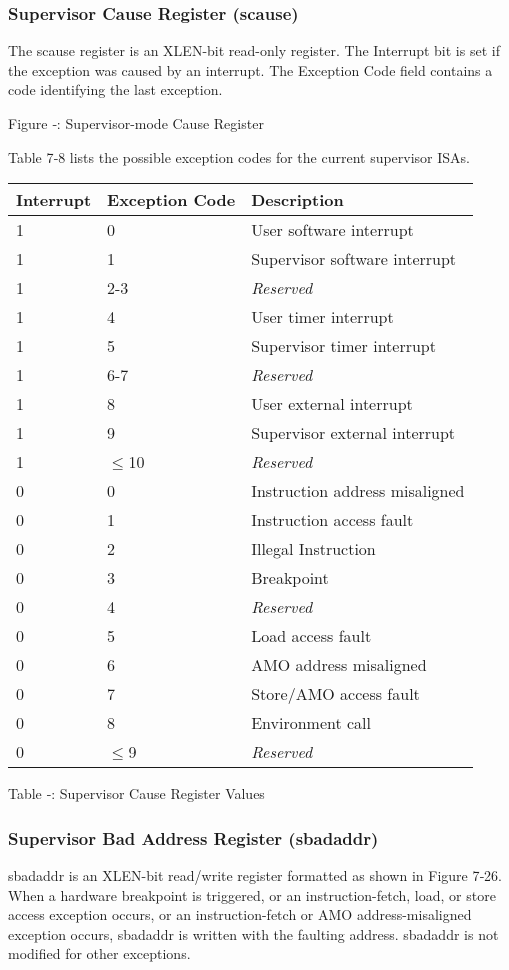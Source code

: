 \subsubsection{Supervisor Cause Register (scause)
}\label{supervisor-cause-register-scause}

The scause register is an XLEN-bit read-only register. The Interrupt bit
is set if the exception was caused by an interrupt. The Exception Code
field contains a code identifying the last exception.

\missingfigure{}

Figure ‑: Supervisor-mode Cause Register

Table 7‑8 lists the possible exception codes for the current supervisor
ISAs.

\begin{longtable}[]{@{}lll@{}}
\toprule
Interrupt & Exception Code & Description\tabularnewline
\midrule
\endhead
1 & 0 & User software interrupt\tabularnewline
1 & 1 & Supervisor software interrupt\tabularnewline
1 & 2-3 & \emph{Reserved}\tabularnewline
1 & 4 & User timer interrupt\tabularnewline
1 & 5 & Supervisor timer interrupt\tabularnewline
1 & 6-7 & \emph{Reserved}\tabularnewline
1 & 8 & User external interrupt\tabularnewline
1 & 9 & Supervisor external interrupt\tabularnewline
1 & $\leqslant$10 & \emph{Reserved}\tabularnewline
0 & 0 & Instruction address misaligned\tabularnewline
0 & 1 & Instruction access fault\tabularnewline
0 & 2 & Illegal Instruction\tabularnewline
0 & 3 & Breakpoint\tabularnewline
0 & 4 & \emph{Reserved}\tabularnewline
0 & 5 & Load access fault\tabularnewline
0 & 6 & AMO address misaligned\tabularnewline
0 & 7 & Store/AMO access fault\tabularnewline
0 & 8 & Environment call\tabularnewline
0 & $\leqslant$9 & \emph{Reserved}\tabularnewline
\bottomrule
\end{longtable}

\protect\hypertarget{_Ref326948300}{}{}Table ‑: Supervisor Cause
Register Values

\subsubsection{Supervisor Bad Address Register
(sbadaddr)}\label{supervisor-bad-address-register-sbadaddr}

sbadaddr is an XLEN-bit read/write register formatted as shown in Figure
7‑26. When a hardware breakpoint is triggered, or an instruction-fetch,
load, or store access exception occurs, or an instruction-fetch or AMO
address-misaligned exception occurs, sbadaddr is written with the
faulting address. sbadaddr is not modified for other exceptions.

